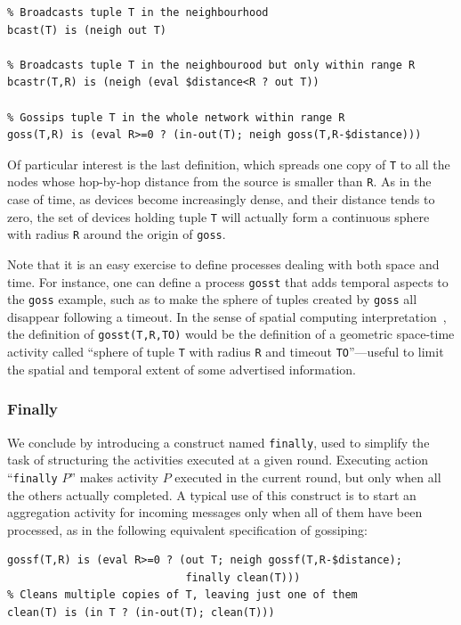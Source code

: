 \documentclass[12pt,a4paper,twoside,openright]{book}
\begin{document}
{\begin{verbatim}
% Broadcasts tuple T in the neighbourhood
bcast(T) is (neigh out T)

% Broadcasts tuple T in the neighbourood but only within range R 
bcastr(T,R) is (neigh (eval $distance<R ? out T))

% Gossips tuple T in the whole network within range R
goss(T,R) is (eval R>=0 ? (in-out(T); neigh goss(T,R-$distance)))
\end{verbatim}}

\noindent Of particular interest is the last definition, which spreads one copy of \texttt{T} to all the nodes whose hop-by-hop distance from the source is smaller than \texttt{R}.
%
As in the case of time, as devices become increasingly dense, and their distance tends to zero, the set of devices holding tuple \texttt{T} will actually form a continuous sphere with radius \texttt{R} around the origin of \texttt{goss}.

Note that it is an easy exercise to define processes dealing with both space and time.
%
For instance, one can define a process \texttt{gosst} that adds temporal aspects to the \texttt{goss} example, such as to make the sphere of tuples created by \texttt{goss} all disappear following a timeout.
%
In the sense of spatial computing interpretation~\cite{proto}, the definition of \texttt{gosst(T,R,TO)} would be the definition of a geometric space-time activity called ``sphere of tuple \texttt{T} with radius \texttt{R} and timeout \texttt{TO}''---useful to limit the spatial and temporal extent of some advertised information.

\subsubsection{Finally}

We conclude by introducing a construct named \texttt{finally}, used to simplify the task of structuring the activities executed at a given round.
%
Executing action ``\texttt{finally} $P$'' makes activity $P$ executed in the current round, but only when all the others actually completed.
%
A typical use of this construct is to start an aggregation activity for incoming messages only when all of them have been processed, as in the following equivalent specification of gossiping:
{
\begin{verbatim}
gossf(T,R) is (eval R>=0 ? (out T; neigh gossf(T,R-$distance); 
                            finally clean(T)))
% Cleans multiple copies of T, leaving just one of them
clean(T) is (in T ? (in-out(T); clean(T)))
\end{verbatim}
}
\end{document}
